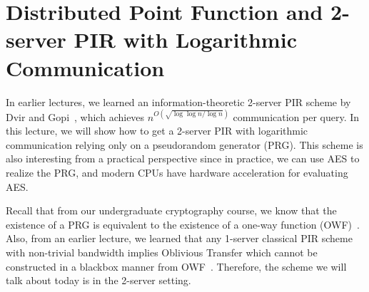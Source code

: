 \newcommand{\DpfGen}{\ensuremath{{\sf DPF.Gen}}}
\newcommand{\DpfEval}{\ensuremath{{\sf DPF.Eval}}}
\newcommand{\Dpf}{\ensuremath{{\sf DPF}}}
\newcommand{\DPF}{\ensuremath{{\sf DPF}}}
\newcommand{\Prg}{\ensuremath{{\sf PRG}}}
\newcommand{\Pbc}{\ensuremath{{\sf PBC}}}

\newcommand{\GenSched}{\ensuremath{{\sf GenSchedule}}}
\newcommand{\ServerPre}{\ensuremath{{\sf ServerPreprocess}}}
\newcommand{\ClientQ}{\ensuremath{{\sf ClientQuery}}}
\newcommand{\ServerA}{\ensuremath{{\sf ServerAnswer}}}
\newcommand{\ClientD}{\ensuremath{{\sf ClientDecode}}}
\newcommand{\get}{\ensuremath{\leftarrow}}
\newcommand{\Client}{\textsf{Client}~}
\newcommand{\Server}{\textsf{Server}~}
\newcommand{\CV}{\ensuremath{{\sf CV}}}

\renewcommand{\root}{\ensuremath{{\sf root}}}

\section{Distributed Point Function and 2-server PIR with Logarithmic Communication} %

In earlier lectures, we learned an information-theoretic 2-server PIR
scheme 
by Dvir and Gopi~\cite{dvir20162}, which
achieves $n^{O(\sqrt{\log \log n / \log n})}$ communication per query. 
In this lecture, 
we will show how to get a 2-server PIR with logarithmic communication
relying only on a pseudorandom 
generator (PRG). This scheme is also interesting from a practical perspective
since in practice, we can use AES to realize
the PRG, and modern CPUs have hardware acceleration
for evaluating AES. 

Recall that 
from our undergraduate cryptography course, 
we know that the existence of a PRG
is equivalent to the existence of a one-way function (OWF)~\cite{haastad1999pseudorandom}.
Also, from an earlier lecture, we learned that any 1-server
classical PIR scheme 
with non-trivial bandwidth implies
Oblivious Transfer which cannot be constructed
in a blackbox manner from OWF~\cite{IR89}. 
Therefore, the scheme we will talk about today is in the 2-server setting.


